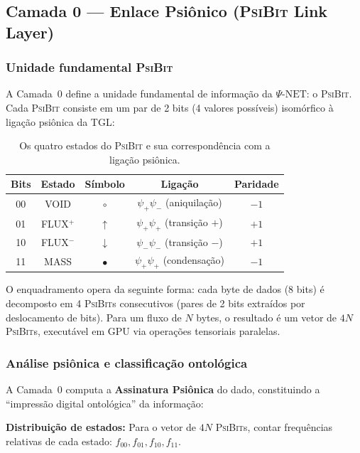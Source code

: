 \documentclass[12pt,a4paper]{article}
\newcommand{\PsiBit}{\textsc{PsiBit}}
\newcommand{\PsiNet}{\Psi\text{-NET}}
\begin{document}
\subsection{Camada 0 --- Enlace Psiônico (\PsiBit{} Link Layer)}

\subsubsection{Unidade fundamental \PsiBit}

A Camada~0 define a unidade fundamental de informação da
$\PsiNet$: o \PsiBit. Cada \PsiBit{} consiste em um par de 2
bits (4 valores possíveis) isomórfico à ligação psiônica da TGL:

\begin{table}[H]
\centering
\caption{Os quatro estados do \PsiBit{} e sua correspondência
com a ligação psiônica.}
\label{tab:psibit}
\begin{tabular}{ccccc}
\toprule
\textbf{Bits} & \textbf{Estado} & \textbf{Símbolo} &
  \textbf{Ligação} & \textbf{Paridade} \\
\midrule
00 & VOID & $\circ$ & $\psi_+\psi_-$ (aniquilação)
  & $-1$ \\
01 & FLUX$^+$ & $\uparrow$ & $\psi_+\psi_+$ (transição $+$)
  & $+1$ \\
10 & FLUX$^-$ & $\downarrow$ & $\psi_-\psi_-$ (transição $-$)
  & $+1$ \\
11 & MASS & $\bullet$ & $\psi_+\psi_+$ (condensação)
  & $-1$ \\
\bottomrule
\end{tabular}
\end{table}

O enquadramento opera da seguinte forma: cada byte de dados
(8 bits) é decomposto em 4 \PsiBit{}s consecutivos (pares de 2
bits extraídos por deslocamento de bits). Para um fluxo de $N$
bytes, o resultado é um vetor de $4N$ \PsiBit{}s, executável em
GPU via operações tensoriais paralelas.

\subsubsection{Análise psiônica e classificação ontológica}

A Camada~0 computa a \textbf{Assinatura Psiônica} do dado,
constituindo a ``impressão digital ontológica'' da informação:

\textbf{Distribuição de estados:} Para o vetor de $4N$
\PsiBit{}s, contar frequências relativas de cada estado:
$f_{00}, f_{01}, f_{10}, f_{11}$.
\end{document}
